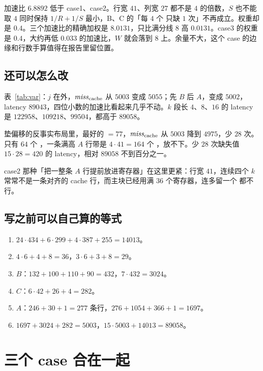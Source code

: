 加速比 $6.8892$ 低于 case1、case2。行宽 $41$、列宽 $27$ 都不是 $4$ 的倍数，$S$ 也不能取 $4$ 同时保持 $1/R+1/S$ 最小，B、C 的「每 $4$ 个  只缺 $1$ 次」不再成立。权重却是 $0.4$。三个加速比的精确加权是 $8.0131$，只比满分线 $8$ 高 $0.0131$。case3 的权重是 $0.4$，大约再低 $0.033$ 的加速比，$W$ 就会落到 $8$ 上。余量不大，这个 case 的边缘和行数手算值得在报告里留位置。

\subsection{还可以怎么改}

表~\ref{tab:var}：$j$ 在外，$\mathit{miss}_{\mathrm{cache}}$ 从 $5003$ 变成 $5055$；先 $B$ 后 $A$，变成 $5002$，latency $89043$，四位小数的加速比看起来几乎不动。$k$ 段长 $4$、$8$、$16$ 的 latency 是 $122958$、$109218$、$99504$，都高于 $89058$。

垫偏移的反事实布局里，最好的 $=77$，$\mathit{miss}_{\mathrm{cache}}$ 从 $5003$ 降到 $4975$，少 $28$ 次。 只有 $64$ 个 ，一条满高 $A$ 行带是 $4\cdot41=164$ 个 ，放不下。少 $28$ 次缺失值 $15\cdot28=420$ 的 latency，相对 $89058$ 不到百分之一。

case2 那种「把一整条 $A$ 行提前放进寄存器」在这里更紧：行宽 $41$，连续四个 $k$ 常常不是一条对齐的 cache 行，而主块已经用满 $36$ 个寄存器，连多留一个  都不行。

\subsection{写之前可以自己算的等式}

\begin{enumerate}
  \item $24\cdot434+6\cdot299+4\cdot387+255=14013$。
  \item $4\cdot6+4+8=36$，$3\cdot6+3+8=29$。
  \item $B$：$132+100+110+90=432$，$7\cdot432=3024$。
  \item $C$：$6\cdot42+26+4=282$。
  \item $A$：$246+30+1=277$ 条行，$276+1054+366+1=1697$。
  \item $1697+3024+282=5003$，$15\cdot5003+14013=89058$。
\end{enumerate}

\section{三个 case 合在一起}
\label{sec:together}

